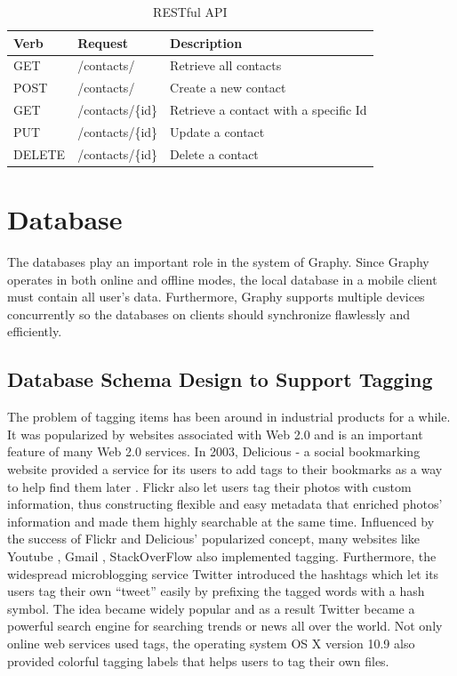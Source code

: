\begin{table}[!ht]
\centering
\caption{RESTful API}\label{tb:restapi}
\begin{tabular}{| l | l | p{3.5cm} |} \hline
\textbf{Verb} & \textbf{Request} & \textbf{Description}\\ \hline
GET & /contacts/ & Retrieve all contacts\\ \hline
POST & /contacts/ & Create a new contact\\ \hline
GET & /contacts/\{id\} & Retrieve a contact with a specific Id\\ \hline
PUT & /contacts/\{id\} & Update a contact\\ \hline
DELETE & /contacts/\{id\} & Delete a contact\\ \hline
\end{tabular}
\end{table}


\section{Database}
The databases play an important role in the system of Graphy. Since Graphy operates in both online and offline modes, the local database in a mobile client must contain all user's data. Furthermore, Graphy supports multiple devices concurrently so the databases on clients should synchronize flawlessly and efficiently.

\subsection{Database Schema Design to Support Tagging}\label{databasedesign}
The problem of tagging items has been around in industrial products for a while. It was popularized by websites associated with Web 2.0 and is an important feature of many Web 2.0 services. In 2003, Delicious - a social bookmarking website provided a service for its users to add tags to their bookmarks as a way to help find them later \cite{delicious}. Flickr \cite{flickr} also let users tag their photos with custom information, thus constructing flexible and easy metadata that enriched photos' information and made them highly searchable at the same time. Influenced by the success of Flickr and Delicious' popularized concept, many websites like Youtube \cite{youtube}, Gmail \cite{gmail}, StackOverFlow \cite{stackoverflow} also implemented tagging. Furthermore, the widespread microblogging service Twitter \cite{twitter} introduced the hashtags which let its users tag their own ``tweet'' easily by prefixing the tagged words with a hash symbol. The idea became widely popular and as a result Twitter became a powerful search engine for searching trends or news all over the world. Not only online web services used tags, the operating system OS X version 10.9 also provided colorful tagging labels \cite{osxtag} that helps users to tag their own files.

